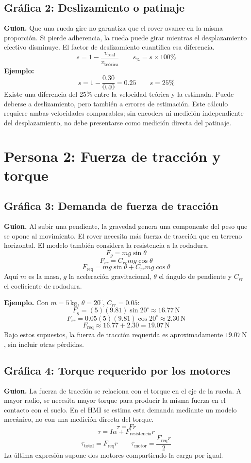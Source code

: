 \documentclass[12pt,a4paper]{article}
\begin{document}
\subsection{Gráfica 2: Deslizamiento o patinaje}
\textbf{Guion.} Que una rueda gire no garantiza que el rover avance en la misma proporción. Si pierde adherencia, la rueda puede girar mientras el desplazamiento efectivo disminuye. El factor de deslizamiento cuantifica esa diferencia.
\[
\boxed{s=1-\frac{v_{\mathrm{real}}}{v_{\mathrm{teórica}}}}
\qquad
s_{\%}=s\times100\%
\]
\textbf{Ejemplo:}
\[
s=1-\frac{0.30}{0.40}=0.25
\qquad
\boxed{s=25\%}
\]
Existe una diferencia del 25\% entre la velocidad teórica y la estimada. Puede deberse a deslizamiento, pero también a errores de estimación. Este cálculo requiere ambas velocidades comparables; sin encoders ni medición independiente del desplazamiento, no debe presentarse como medición directa del patinaje.

\section{Persona 2: Fuerza de tracción y torque}
\subsection{Gráfica 3: Demanda de fuerza de tracción}
\textbf{Guion.} Al subir una pendiente, la gravedad genera una componente del peso que se opone al movimiento. El rover necesita más fuerza de tracción que en terreno horizontal. El modelo también considera la resistencia a la rodadura.
\[
F_g=mg\sin\theta
\]
\[
F_{rr}=C_{rr}mg\cos\theta
\]
\[
\boxed{F_{\mathrm{req}}=mg\sin\theta+C_{rr}mg\cos\theta}
\]
Aquí \(m\) es la masa, \(g\) la aceleración gravitacional, \(\theta\) el ángulo de pendiente y \(C_{rr}\) el coeficiente de rodadura.

\textbf{Ejemplo.} Con \(m=5\,\mathrm{kg}\), \(\theta=20^\circ\), \(C_{rr}=0.05\):
\[
F_g=(5)(9.81)\sin20^\circ\approx16.77\,\mathrm{N}
\]
\[
F_{rr}=0.05(5)(9.81)\cos20^\circ\approx2.30\,\mathrm{N}
\]
\[
\boxed{F_{\mathrm{req}}\approx16.77+2.30=19.07\,\mathrm{N}}
\]
Bajo estos supuestos, la fuerza de tracción requerida es aproximadamente \(19.07\,\mathrm{N}\), sin incluir otras pérdidas.

\subsection{Gráfica 4: Torque requerido por los motores}
\textbf{Guion.} La fuerza de tracción se relaciona con el torque en el eje de la rueda. A mayor radio, se necesita mayor torque para producir la misma fuerza en el contacto con el suelo. En el HMI se estima esta demanda mediante un modelo mecánico, no con una medición directa del torque.
\[
\boxed{\tau=Fr}
\]
\[
\tau=I\alpha+F_{\mathrm{resistencia}}r
\]
\[
\boxed{\tau_{\mathrm{total}}=F_{\mathrm{req}}r}
\qquad
\boxed{\tau_{\mathrm{motor}}=\frac{F_{\mathrm{req}}r}{2}}
\]
La última expresión supone dos motores compartiendo la carga por igual.
\end{document}
